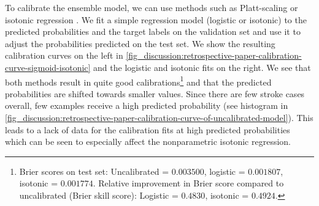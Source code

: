 To calibrate the ensemble model, we can use methods such as Platt-scaling \parencite{platt_probabilistic_1999} or isotonic regression \parencite{zadrozny_transforming_2002}. 
We fit a simple regression model (logistic or isotonic) to the predicted probabilities and the target labels on the validation set and use it to adjust the probabilities predicted on the test set. We show the resulting calibration curves on the left in \cref{fig_discussion:retrospective-paper-calibration-curve-sigmoid-isotonic} and the logistic and isotonic fits on the right. 
We see that both methods result in quite good calibrations\footnote{Brier scores on test set: Uncalibrated = $0.003500$, logistic = $0.001807$, isotonic = $0.001774$. Relative improvement in Brier score compared to uncalibrated (Brier skill score): Logistic = $0.4830$, isotonic = $0.4924$.} and that the predicted probabilities are shifted towards smaller values. Since there are few stroke cases overall, few examples receive a high predicted probability (see histogram in \cref{fig_discussion:retrospective-paper-calibration-curve-of-uncalibrated-model}). This leads to a lack of data for the calibration fits at high predicted probabilities which can be seen to especially affect the nonparametric isotonic regression.


